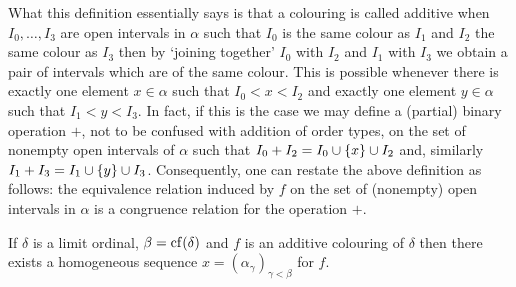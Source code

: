 \begin{rem}
	What this definition essentially says is that a colouring is called additive when $I_0,\dotsc, I_3$ are open intervals in $\alpha$ such that $I_0$ is the same colour as $I_1$ and $I_2$ the same colour as $I_3$ then by `joining together' $I_0$ with $I_2$ and $I_1$ with $I_3$ we obtain a pair of intervals which are of the same colour.  This is possible whenever there is exactly one element $x\in\alpha$ such that $I_0<x<I_2$ and exactly one element $y\in\alpha$ such that $I_1<y<I_3$.  In fact, if this is the case we may define a (partial) binary operation $+$, not to be confused with addition of order types, on the set of nonempty open intervals of $\alpha$ such that $I_0+I_2=I_0\cup\left\lbrace x\right\rbrace\cup I_2$ and, similarly $I_1+I_3=I_1\cup\left\lbrace y\right\rbrace\cup I_3$.  Consequently, one can restate the above definition as follows: the equivalence relation induced by $f$ on the set of (nonempty) open intervals in $\alpha$ is a congruence relation for the operation $+$.
\end{rem}

\begin{thm}
	If $\delta$ is a limit ordinal, $\beta=\operatorname{cf}(\delta)$ and $f$ is an additive colouring of $\delta$ then there exists a homogeneous sequence $x=(\alpha_\gamma)_{\gamma<\beta}$ for $f$.
\end{thm}

